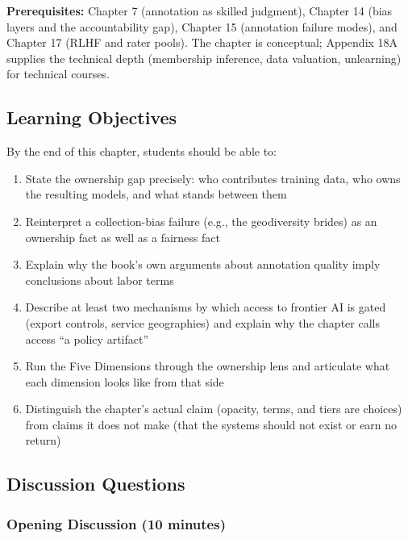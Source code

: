 \textbf{Prerequisites:} Chapter 7 (annotation as skilled judgment), Chapter 14 (bias layers and the accountability gap), Chapter 15 (annotation failure modes), and Chapter 17 (RLHF and rater pools). The chapter is conceptual; Appendix 18A supplies the technical depth (membership inference, data valuation, unlearning) for technical courses.

\subsection*{Learning Objectives}

By the end of this chapter, students should be able to:

\begin{enumerate}
    \item State the ownership gap precisely: who contributes training data, who owns the resulting models, and what stands between them
    \item Reinterpret a collection-bias failure (e.g., the geodiversity brides) as an ownership fact as well as a fairness fact
    \item Explain why the book's own arguments about annotation quality imply conclusions about labor terms
    \item Describe at least two mechanisms by which access to frontier AI is gated (export controls, service geographies) and explain why the chapter calls access ``a policy artifact''
    \item Run the Five Dimensions through the ownership lens and articulate what each dimension looks like from that side
    \item Distinguish the chapter's actual claim (opacity, terms, and tiers are choices) from claims it does not make (that the systems should not exist or earn no return)
\end{enumerate}

\subsection*{Discussion Questions}

\subsubsection*{Opening Discussion (10 minutes)}

